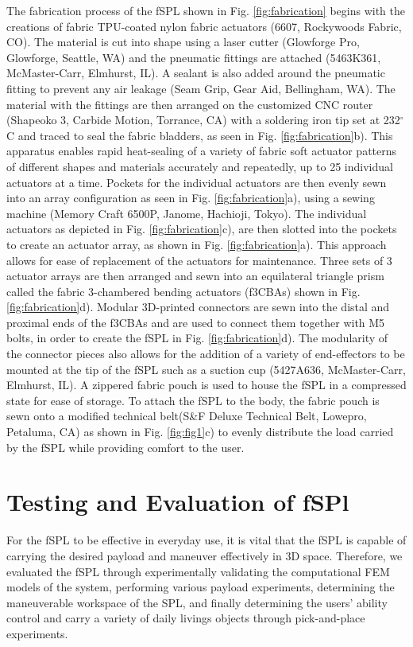 \documentclass[letterpaper, 10 pt, conference]{ieeeconf}  %
\begin{document}
The fabrication process of the fSPL shown in Fig. \ref{fig:fabrication} begins with the creations of fabric TPU-coated nylon fabric actuators (6607, Rockywoods Fabric, CO). The material is cut into shape using a laser cutter (Glowforge Pro, Glowforge, Seattle, WA) and the pneumatic fittings are attached (5463K361, McMaster-Carr, Elmhurst, IL). A sealant is also added around the pneumatic fitting to prevent any air leakage (Seam Grip, Gear Aid, Bellingham, WA). The material with the fittings are then arranged on the customized CNC router (Shapeoko 3, Carbide Motion, Torrance, CA) with a soldering iron tip set at 232$^{\circ}$C and traced to seal the fabric bladders, as seen in Fig. \ref{fig:fabrication}b). This apparatus enables rapid heat-sealing of a variety of fabric soft actuator patterns of different shapes and materials accurately and repeatedly, up to 25 individual actuators at a time. Pockets for the individual actuators are then evenly sewn into an array configuration as seen in Fig. \ref{fig:fabrication}a), using a sewing machine (Memory Craft 6500P, Janome, Hachioji, Tokyo). The individual actuators as depicted in Fig. \ref{fig:fabrication}c), are then slotted into the pockets to create an actuator array, as shown in Fig. \ref{fig:fabrication}a). This approach allows for ease of replacement of the actuators for maintenance. Three sets of 3 actuator arrays are then arranged and sewn into an equilateral triangle prism called the fabric 3-chambered bending actuators (f3CBAs) shown in Fig. \ref{fig:fabrication}d). Modular 3D-printed connectors are sewn into the distal and proximal ends of the f3CBAs and are used to connect them together with M5 bolts, in order to create the fSPL in Fig. \ref{fig:fabrication}d). The modularity of the connector pieces also allows for the addition of a variety of end-effectors to be mounted at the tip of the fSPL such as a suction cup (5427A636, McMaster-Carr, Elmhurst, IL). A zippered fabric pouch is used to house the fSPL in a compressed state for ease of storage. To attach the fSPL to the body, the fabric pouch is sewn onto a modified technical belt(S\&F Deluxe Technical Belt, Lowepro, Petaluma, CA) as shown in Fig. \ref{fig:fig1}c) to evenly distribute the load carried by the fSPL while providing comfort to the user. 
\section{Testing and Evaluation of fSPl}
For the fSPL to be effective in everyday use, it is vital that the fSPL is capable of carrying the desired payload and maneuver effectively in 3D space. Therefore, we evaluated the fSPL through experimentally validating the computational FEM models of the system, performing various payload experiments, determining the maneuverable workspace of the SPL, and finally determining the users' ability control and carry a variety of daily livings objects through pick-and-place experiments.
\end{document}
